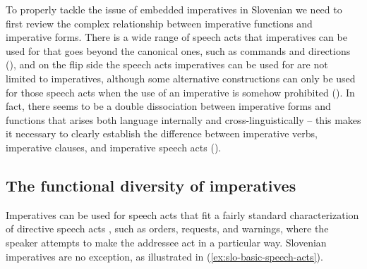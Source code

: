 \documentclass[output=paper,colorlinks,citecolor=brown]{langscibook}
\begin{document}
To properly tackle the issue of embedded imperatives in Slovenian we need to first review the complex relationship between imperative functions and imperative forms. There is a wide range of speech acts that imperatives can be used for that goes beyond the canonical ones, such as commands and directions (), and on the flip side the speech acts imperatives can be used for are not limited to imperatives, although some alternative constructions can only be used for those speech acts when the use of an imperative is somehow prohibited (). In fact, there seems to be a double dissociation between imperative forms and functions that arises both language internally and cross-linguistically -- this makes it necessary to clearly establish the difference between imperative verbs, imperative clauses, and imperative speech acts ().

\subsection{The functional diversity of imperatives}
\label{subsec:functional-diversity}

Imperatives can be used for speech acts that fit a fairly standard characterization of directive speech acts \citep[see][11 and ]{searle76}, such as orders, requests, and warnings, where the speaker
attempts to make the addressee act in a particular way. Slovenian imperatives are no exception, as illustrated in (\ref{ex:slo-basic-speech-acts}).%

\ea \label{ex:slo-basic-speech-acts}
\z\z
\end{document}
